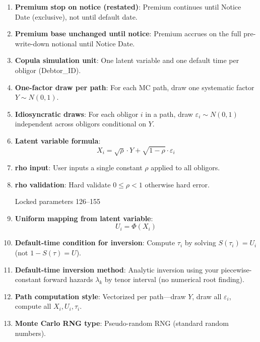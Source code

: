 \documentclass[11pt]{article}
\begin{document}
\begin{enumerate}[label=\arabic*),leftmargin=*,align=left]
\item \textbf{Premium stop on notice (restated)}: Premium continues until Notice Date (exclusive), not until default date.

\item \textbf{Premium base unchanged until notice}: Premium accrues on the full pre-write-down notional until Notice Date.

\item \textbf{Copula simulation unit}: One latent variable and one default time per obligor (Debtor\_ID).

\item \textbf{One-factor draw per path}: For each MC path, draw one systematic factor $Y \sim N(0,1)$.

\item \textbf{Idiosyncratic draws}: For each obligor $i$ in a path, draw $\varepsilon_i \sim N(0,1)$ independent across obligors conditional on $Y$.

\item \textbf{Latent variable formula}: 
\[ X_i = \sqrt{\rho} \cdot Y + \sqrt{1-\rho} \cdot \varepsilon_i \]

\item \textbf{rho input}: User inputs a single constant $\rho$ applied to all obligors.

\item \textbf{rho validation}: Hard validate $0 \le \rho < 1$ otherwise hard error.

\vspace{1em}
\noindent Locked parameters 126–155
\vspace{0.5em}

\item \textbf{Uniform mapping from latent variable}: 
\[ U_i = \Phi(X_i) \]

\item \textbf{Default-time condition for inversion}: Compute $\tau_i$ by solving $S(\tau_i) = U_i$ (not $1-S(\tau)=U$).

\item \textbf{Default-time inversion method}: Analytic inversion using your piecewise-constant forward hazards $\lambda_k$ by tenor interval (no numerical root finding).

\item \textbf{Path computation style}: Vectorized per path—draw $Y$, draw all $\varepsilon_i$, compute all $X_i, U_i, \tau_i$.

\item \textbf{Monte Carlo RNG type}: Pseudo-random RNG (standard random numbers).


\end{enumerate}
\end{document}
